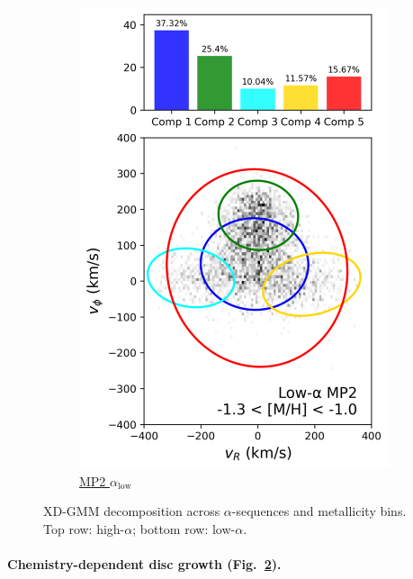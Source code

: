 \documentclass[a4paper,10pt]{article}
\begin{document}
\begin{multicols}{2}
\begin{figure}[H]
\begin{subfigure}[t]{0.24\linewidth}
    \includegraphics[width=\linewidth]{../figures/gmm_mp2_low_alpha_k6.png}
    \caption{\href{https://raw.githack.com/raunaq-rai/Disentangling-the-Milky-Way-using-GMM/main/figures/MP2\_low\_\_\_\_-1.3\%5BM\_H\%5D-1.0.html}{MP2 $\alpha_{\mathrm{low}}$}}
    \label{fig:low_mp2}
  \end{subfigure}


  \caption{XD-GMM decomposition across $\alpha$-sequences and metallicity bins. Top row: high-$\alpha$; bottom row: low-$\alpha$.}
  \label{fig:gmm_alpha_bins}
\end{figure}


\paragraph{Chemistry-dependent disc growth (Fig.~\ref{fig:gmm_alpha_bins}).}


\end{multicols}
\end{document}
